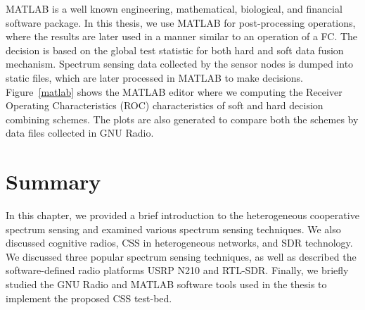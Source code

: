 MATLAB is a well known engineering, mathematical, biological, and financial software package. In this thesis, we use MATLAB for post-processing operations, where the results are later used in a manner similar to an operation of a FC. The decision is based on the global test statistic for both hard and soft data fusion mechanism. Spectrum sensing data collected by the sensor nodes is dumped into static files, which are later processed in MATLAB to make decisions. Figure~\ref{matlab} shows the MATLAB editor where we computing the Receiver Operating Characteristics (ROC) characteristics of soft and hard decision combining schemes. The plots are also generated to compare both the schemes by data files collected in GNU Radio.

\section{Summary}
In this chapter, we provided a brief introduction to the heterogeneous cooperative spectrum sensing and examined various spectrum sensing techniques. We also discussed cognitive radios, CSS in heterogeneous networks, and SDR technology. We discussed three popular spectrum sensing techniques, as well as described the software-defined radio platforms USRP N210 and RTL-SDR. Finally, we briefly studied the GNU Radio and MATLAB software tools used in the thesis to implement the proposed CSS test-bed. 
